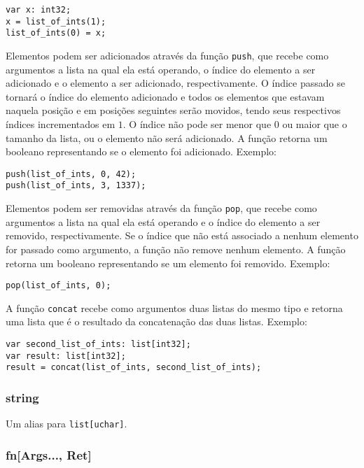 \documentclass[12pt, a4paper]{article}
\begin{document}
\begin{verbatim}
var x: int32;
x = list_of_ints(1);
list_of_ints(0) = x;
\end{verbatim}

Elementos podem ser adicionados através da função \texttt{push}, que recebe como
argumentos a lista na qual ela está operando, o índice do elemento a ser
adicionado e o elemento a ser adicionado, respectivamente. O índice passado se
tornará o índice do elemento adicionado e todos os elementos que estavam naquela
posição e em posições seguintes serão movidos, tendo seus respectivos índices
incrementados em $1$. O índice não pode ser menor que $0$ ou maior que o tamanho
da lista, ou o elemento não será adicionado. A função retorna um booleano
representando se o elemento foi adicionado. Exemplo:

\begin{verbatim}
push(list_of_ints, 0, 42);
push(list_of_ints, 3, 1337);
\end{verbatim}

Elementos podem ser removidas através da função \texttt{pop}, que recebe como
argumentos a lista na qual ela está operando e o índice do elemento a ser
removido, respectivamente. Se o índice que não está associado a nenhum elemento
for passado como argumento, a função não remove nenhum elemento. A função
retorna um booleano representando se um elemento foi removido. Exemplo:

\begin{verbatim}
pop(list_of_ints, 0);
\end{verbatim}

A função \texttt{concat} recebe como argumentos duas listas do mesmo tipo e
retorna uma lista que é o resultado da concatenação das duas listas. Exemplo:

\begin{verbatim}
var second_list_of_ints: list[int32];
var result: list[int32];
result = concat(list_of_ints, second_list_of_ints);
\end{verbatim}

\subsubsection{string}

Um alias para \texttt{list[uchar]}.

\subsubsection{fn[Args..., Ret]}
\end{document}
